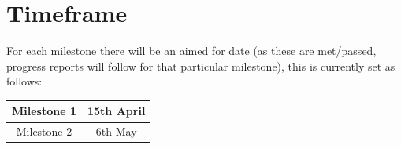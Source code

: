 \documentclass[14pt]{extarticle}
\begin{document}
\section{Timeframe}
For each milestone there will be an aimed for date (as these are met/passed, progress reports will follow for that particular milestone), this is currently set as follows:

\begin{longtable}{|c|c|}

\hline
Milestone 1 & 15th April \\
\hline
Milestone 2 & 6th May \\
\hline

\end{longtable}
\end{document}
